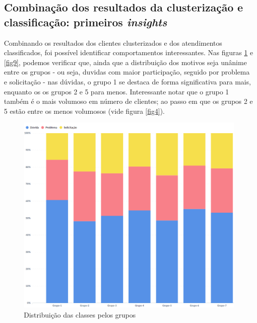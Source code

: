 \documentclass[twocolumn]{rbef}
\newcommand{\1}{\mathbbm{1}}
\begin{document}
\subsection{Combinação dos resultados da clusterização e classificação: primeiros \emph{insights}} \label{Sessao4.4}
Combinando os resultados dos clientes clusterizados e dos atendimentos classificados, foi possível identificar comportamentos interessantes. Nas figuras \ref{fig8} e \ref{fig9}, podemos verificar que, ainda que a distribuição dos motivos seja unânime entre os grupos - ou seja, duvidas com maior participação, seguido por problema e solicitação - nas dúvidas, o grupo 1 se destaca de forma significativa para mais, enquanto os os grupos 2 e 5 para menos. Interessante notar que o grupo 1 também é o mais volumoso em número de clientes; ao passo em que os grupos 2 e 5 estão entre os menos volumosos (vide figura \ref{fig4}).
\begin{figure}[!htb]
  \centering \includegraphics[scale=0.35]{8. Classificação atendimentos (7 clusters) - chart.png}
  \caption{Distribuição das classes pelos grupos}
  \label{fig8}
\end{figure}
\end{document}
